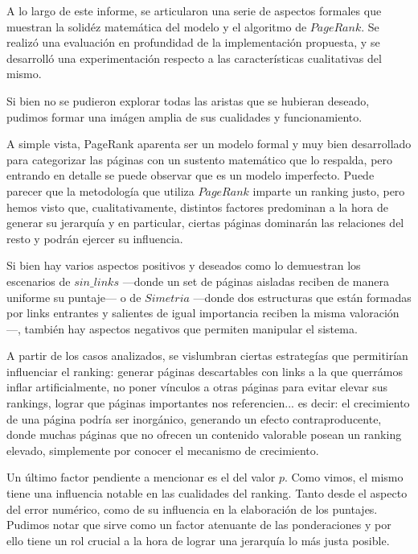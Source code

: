 \vspace{1em}

A lo largo de este informe, se articularon una serie de aspectos formales que muestran la solidéz matemática del modelo y el algoritmo de $PageRank$. Se realizó una evaluación en profundidad de la implementación propuesta, y se desarrolló una experimentación respecto a las características cualitativas del mismo. 

Si bien no se pudieron explorar todas las aristas que se hubieran deseado, pudimos formar una imágen amplia de sus cualidades y funcionamiento. 
\vspace{1em}

A simple vista, PageRank aparenta ser un modelo formal y muy bien desarrollado para categorizar las páginas con un sustento matemático que lo respalda, pero entrando en detalle se puede observar que es un modelo imperfecto. Puede parecer que la metodología que utiliza $PageRank$ imparte un ranking justo, pero hemos visto que, cualitativamente, distintos factores predominan a la hora de generar su jerarquía y en particular, ciertas páginas dominarán las relaciones del resto y podrán ejercer su influencia.  

\vspace{1em}

Si bien hay varios aspectos positivos y deseados como lo demuestran los escenarios de $sin\_links$ ---donde un set de páginas aisladas reciben de manera uniforme su puntaje--- o de $Simetria$ ---donde dos estructuras que están formadas por links entrantes y salientes de igual importancia reciben la misma valoración---, también hay aspectos negativos que permiten manipular el sistema.

\vspace{1em}

A partir de los casos analizados, se vislumbran ciertas estrategías que permitirían influenciar el ranking: generar páginas descartables con links a la que querrámos inflar artificialmente, no poner vínculos a otras páginas para evitar elevar sus rankings, lograr que páginas importantes nos referencien... es decir: el crecimiento de una página podría ser inorgánico, generando un efecto contraproducente, donde muchas páginas que no ofrecen un contenido valorable posean un ranking elevado, simplemente por conocer el mecanismo de crecimiento.

\vspace{1em}
Un último factor pendiente a mencionar es el del valor $p$. Como vimos, el mismo tiene una influencia notable en las cualidades del ranking. Tanto desde el aspecto del error numérico, como de su influencia en la elaboración de los puntajes. Pudimos notar que sirve como un factor atenuante de las ponderaciones y por ello tiene un rol crucial a la hora de lograr una jerarquía lo más justa posible.  

